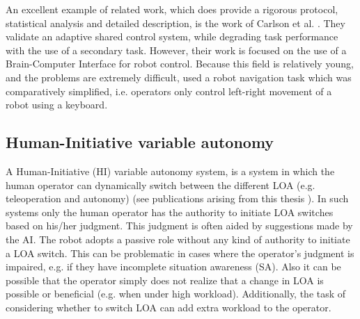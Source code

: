 \documentclass[a4paper,12pt,oneside,openright]{bhamthesis}
\begin{document}
An excellent example of related work, which does provide a rigorous protocol, statistical analysis and detailed description, is the work of Carlson et al. \cite{Carlson2012a}. They validate an adaptive shared control system, while degrading task performance with the use of a secondary task. However, their work is focused on the use of a Brain-Computer Interface for robot control. Because this field is relatively young, and the problems are extremely difficult, \cite{Carlson2012a} used a robot navigation task which was comparatively simplified, i.e. operators only control left-right movement of a robot using a keyboard. 

\subsection{Human-Initiative variable autonomy}
\label{section:HI-background}
A Human-Initiative (HI) variable autonomy system, is a system in which the human operator can dynamically switch between the different LOA (e.g. teleoperation and autonomy) (see publications arising from this thesis \cite{Chiou2016}). In such systems only the human operator has the authority to initiate LOA switches based on his/her judgment. This judgment is often aided by suggestions made by the AI. The robot adopts a passive role without any kind of authority to initiate a LOA switch. This can be problematic in cases where the operator's judgment is impaired, e.g. if they have incomplete situation awareness (SA). Also it can be possible that the operator simply does not realize that a change in LOA is possible or beneficial (e.g. when under high workload). Additionally, the task of considering whether to switch LOA can add extra workload to the operator. 
\end{document}
